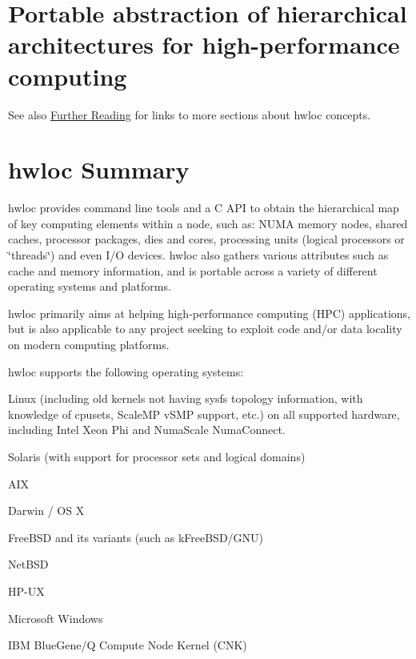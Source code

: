 \section*{Portable abstraction of hierarchical architectures for high-\/performance computing}





 See also \hyperlink{a00379_further_reading}{Further Reading}  for links to more sections about hwloc concepts. 

 \hypertarget{a00379_hwloc_summary}{}\section{hwloc Summary}\label{a00379_hwloc_summary}
hwloc provides command line tools and a C A\+PI to obtain the hierarchical map of key computing elements within a node, such as\+: N\+U\+MA memory nodes, shared caches, processor packages, dies and cores, processing units (logical processors or \char`\"{}threads\char`\"{}) and even I/O devices. hwloc also gathers various attributes such as cache and memory information, and is portable across a variety of different operating systems and platforms.

hwloc primarily aims at helping high-\/performance computing (H\+PC) applications, but is also applicable to any project seeking to exploit code and/or data locality on modern computing platforms.

hwloc supports the following operating systems\+:


\begin{DoxyItemize}
\item Linux (including old kernels not having sysfs topology information, with knowledge of cpusets, Scale\+MP v\+S\+MP support, etc.) on all supported hardware, including Intel Xeon Phi and Numa\+Scale Numa\+Connect. 
\item Solaris (with support for processor sets and logical domains) 
\item A\+IX 
\item Darwin / OS X 
\item Free\+B\+SD and its variants (such as k\+Free\+B\+S\+D/\+G\+NU) 
\item Net\+B\+SD 
\item H\+P-\/\+UX 
\item Microsoft Windows 
\item I\+BM Blue\+Gene/Q Compute Node Kernel (C\+NK) 
\end{DoxyItemize}

